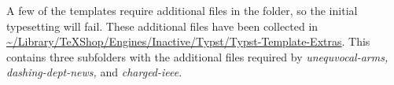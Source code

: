 \documentclass[11pt, oneside]{article}   	%
\begin{document}
A few of the templates require additional files in the folder, so the initial typesetting will fail. These additional
files have been collected in \url{~/Library/TeXShop/Engines/Inactive/Typst/Typst-Template-Extras}. This
contains three subfolders with the additional files required by {\em unequvocal-arms, dashing-dept-news,} and {\em charged-ieee}. 

 

%
%
%
%
%
%
%
%
\end{document}

